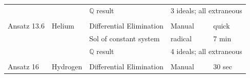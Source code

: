 \documentclass{article}
\begin{document}
\begin{longtable}{lllll}
           &               &$\mathbb{Q}$ result                 &\multicolumn{2}{l}{3 ideals; all extraneous}\\
           &               &                         &                      &\\
Ansatz 13.6&Helium         &Differential Elimination &Manual                &quick\\
           &               &Sol of constant system   &\R32003 radical             &7 min\\
           &               &$\mathbb{Q}$ result                 &\multicolumn{2}{l}{4 ideals; all extraneous}\\
           &               &                         &                      &\\
Ansatz 16  &Hydrogen       &Differential Elimination &Manual                &30 sec\\

\end{longtable}

\end{document}
